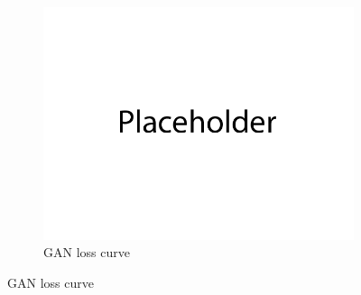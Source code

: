 \documentclass{article}
\begin{document}
\begin{enumerate}[(a)]
\begin{figure}[H]
    \\
    \begin{subfigure}{0.34\textwidth}
        \centering
        \includegraphics[width=\textwidth]{figures/q1b_losses.png}
        \caption{GAN loss curve}
    \end{subfigure}
\end{figure}
\end{enumerate}



\newpage
{}
\end{document}
